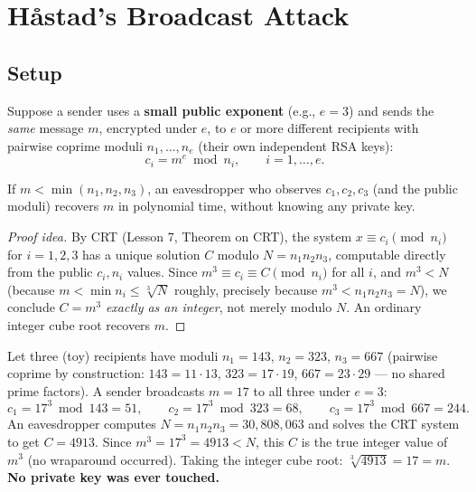 \newpage
\section{Håstad's Broadcast Attack}

\subsection{Setup}
Suppose a sender uses a \textbf{small public exponent} (e.g., $e=3$) and sends the \emph{same} message $m$, encrypted under $e$, to $e$ or more different recipients with pairwise coprime moduli $n_1, \dots, n_e$ (their own independent RSA keys):
\[
c_i = m^e \bmod n_i, \qquad i = 1, \dots, e.
\]

\begin{theorem}[Håstad's broadcast attack, $e=3$ identical-message case]
If $m < \min(n_1,n_2,n_3)$, an eavesdropper who observes $c_1,c_2,c_3$ (and the public moduli) recovers $m$ in polynomial time, without knowing any private key.
\end{theorem}

\begin{proof}[Proof idea]
By CRT (Lesson 7, Theorem on CRT), the system $x \equiv c_i \pmod{n_i}$ for $i=1,2,3$ has a unique solution $C$ modulo $N = n_1 n_2 n_3$, computable directly from the public $c_i, n_i$ values. Since $m^3 \equiv c_i \equiv C \pmod{n_i}$ for all $i$, and $m^3 < N$ (because $m < \min n_i \le \sqrt[3]{N}$ roughly, precisely because $m^3 < n_1n_2n_3=N$), we conclude $C = m^3$ \emph{exactly as an integer}, not merely modulo $N$. An ordinary integer cube root recovers $m$.
\end{proof}

\begin{example}[Håstad's attack, $e=3$, fully worked]
Let three (toy) recipients have moduli $n_1 = 143$, $n_2 = 323$, $n_3 = 667$ (pairwise coprime by construction: $143=11\cdot13$, $323=17\cdot19$, $667=23\cdot29$ — no shared prime factors). A sender broadcasts $m=17$ to all three under $e=3$:
\[
c_1 = 17^3 \bmod 143 = 51, \qquad c_2 = 17^3 \bmod 323 = 68, \qquad c_3 = 17^3 \bmod 667 = 244.
\]
An eavesdropper computes $N = n_1n_2n_3 = 30{,}808{,}063$ and solves the CRT system to get $C = 4913$. Since $m^3 = 17^3 = 4913 < N$, this $C$ is the true integer value of $m^3$ (no wraparound occurred). Taking the integer cube root: $\sqrt[3]{4913} = 17 = m$. \textbf{No private key was ever touched.}
\end{example}

